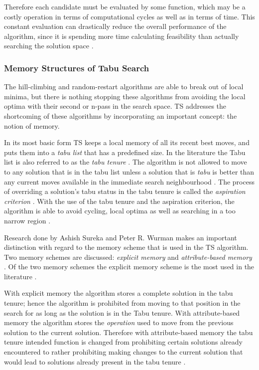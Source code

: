 Therefore each candidate must be evaluated by some function, which may be a costly operation in terms of computational cycles as well as in terms of time\cite{EvoParallelTabu,TabuVechicleRoutingWithTimeWindows}. This constant evaluation can drastically reduce the overall performance of the algorithm, since it is spending more time calculating feasibility than actually searching the solution space \cite{EvoParallelTabu,TabuVechicleRoutingWithTimeWindows}. 

\subsubsection{Memory Structures of Tabu Search}
The hill-climbing and random-restart algorithms are able to break out of local minima, but there is nothing stopping these algorithms from avoiding the local optima with their second or n-pass in the search space. \gls{TS} addresses the shortcoming of these algorithms by incorporating an important concept: the notion of memory.

In its most basic form \gls{TS} keeps a local memory of all its recent best moves, and puts them into a \emph{tabu list} that has a predefined size. In the literature the Tabu list is also referred to as the \emph{tabu tenure} \cite{TSHazardous,TabuCarryOver}. The algorithm is not allowed to move to any solution that is in the tabu list unless a solution that is \emph{tabu} is better than any current moves available in the immediate search neighbourhood \cite{TabuCarryOver,ReactiveTabuVHR}. The process of overriding a solution's tabu status in the tabu tenure is called the \emph{aspiration criterion} \cite{TSHazardous,TabuCarryOver}. With the use of the tabu tenure and the aspiration criterion, the algorithm is able to avoid cycling, local optima as well as searching in a too narrow region \cite{TabuSingleMachineScheduling,CircuitTabu}.

Research done by Ashish Sureka and Peter R. Wurman makes an important distinction with regard to the memory scheme that is used in the \gls{TS} algorithm. Two memory schemes are discussed: \emph{explicit memory} and \emph{attribute-based memory} \cite{TabuBiddingStrats,TabuFormGames}. Of the two memory schemes the explicit memory scheme is the most used in the literature \cite{TabuVechicleRoutingWithTimeWindows}.

With explicit memory the algorithm stores a complete solution in the tabu tenure; hence the algorithm is prohibited from moving to that position in the search for as long as the solution is in the Tabu tenure\cite{TabuBiddingStrats,TabuFormGames}. With attribute-based memory the algorithm stores the \emph{operation} used to move from the previous solution to the current solution\cite{TabuBiddingStrats,TabuFormGames}. Therefore with attribute-based memory the tabu tenure intended function is changed from prohibiting certain solutions already encountered to rather prohibiting making changes to the current solution that would lead to solutions already present in the tabu tenure \cite{TabuBiddingStrats,TabuFormGames}.

